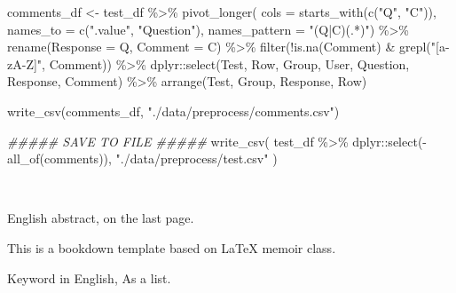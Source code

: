 \documentclass[
  12pt,
  a4paper,
  extrafontsizes,
  onecolumn,
  openright]{memoir}
\makeatletter
\newenvironment{Shaded}{\begin{snugshade}}{\end{snugshade}}
\newcommand{\AttributeTok}[1]{\textcolor[rgb]{0.40,0.45,0.13}{#1}}
\newcommand{\DocumentationTok}[1]{\textcolor[rgb]{0.37,0.37,0.37}{\textit{#1}}}
\newcommand{\FunctionTok}[1]{\textcolor[rgb]{0.28,0.35,0.67}{#1}}
\newcommand{\NormalTok}[1]{\textcolor[rgb]{0.00,0.23,0.31}{#1}}
\newcommand{\OtherTok}[1]{\textcolor[rgb]{0.00,0.23,0.31}{#1}}
\newcommand{\SpecialCharTok}[1]{\textcolor[rgb]{0.37,0.37,0.37}{#1}}
\newcommand{\StringTok}[1]{\textcolor[rgb]{0.13,0.47,0.30}{#1}}
\newcommand{\MemoirChapStyle}{daleif1}
\newcommand{\MemoirPageStyle}{Ruled}
\newlength\widthw %
\newcommand*{\SmallMargins}{
  \setlrmarginsandblock{1.5in}{1.5in}{*}
  \setmarginnotes{0.1in}{0.1in}{0.1in}
  \setulmarginsandblock{1.5in}{1in}{*}
  \checkandfixthelayout
  \ch@ngetext
  \clearpage
  \setlength{\widthw}{\textwidth+\marginparsep+\marginparwidth}
  \footnotesatfoot
  \chapterstyle{\MemoirChapStyle}  %
  \pagestyle{\MemoirPageStyle}
}
\newcommand{\evenpage}{
  \clearpage
  \strictpagecheck %
  \checkoddpage
  \ifoddpage
    \thispagestyle{empty}
    ~\\ %
    \newpage
  \else
  \fi

  
}
\makeatother
\begin{document}
\begin{Shaded}
\begin{Highlighting}[]
\NormalTok{comments\_df }\OtherTok{\textless{}{-}}\NormalTok{ test\_df }\SpecialCharTok{\%\textgreater{}\%}
    \FunctionTok{pivot\_longer}\NormalTok{(}
        \AttributeTok{cols =} \FunctionTok{starts\_with}\NormalTok{(}\FunctionTok{c}\NormalTok{(}\StringTok{"Q"}\NormalTok{, }\StringTok{"C"}\NormalTok{)),}
        \AttributeTok{names\_to =} \FunctionTok{c}\NormalTok{(}\StringTok{".value"}\NormalTok{, }\StringTok{"Question"}\NormalTok{),}
        \AttributeTok{names\_pattern =} \StringTok{"(Q|C)(.*)"}\NormalTok{) }\SpecialCharTok{\%\textgreater{}\%}
    \FunctionTok{rename}\NormalTok{(}\AttributeTok{Response =}\NormalTok{ Q, }\AttributeTok{Comment =}\NormalTok{ C) }\SpecialCharTok{\%\textgreater{}\%}
    \FunctionTok{filter}\NormalTok{(}\SpecialCharTok{!}\FunctionTok{is.na}\NormalTok{(Comment) }\SpecialCharTok{\&} \FunctionTok{grepl}\NormalTok{(}\StringTok{"[a{-}zA{-}Z]"}\NormalTok{, Comment)) }\SpecialCharTok{\%\textgreater{}\%}
\NormalTok{    dplyr}\SpecialCharTok{::}\FunctionTok{select}\NormalTok{(Test, Row, Group, User, Question, Response, Comment) }\SpecialCharTok{\%\textgreater{}\%}
    \FunctionTok{arrange}\NormalTok{(Test, Group, Response, Row)}


\FunctionTok{write\_csv}\NormalTok{(comments\_df, }\StringTok{"./data/preprocess/comments.csv"}\NormalTok{)}

\DocumentationTok{\#\#\#\#\# SAVE TO FILE \#\#\#\#\#}
\FunctionTok{write\_csv}\NormalTok{(}
\NormalTok{    test\_df }\SpecialCharTok{\%\textgreater{}\%}\NormalTok{ dplyr}\SpecialCharTok{::}\FunctionTok{select}\NormalTok{(}\SpecialCharTok{{-}}\FunctionTok{all\_of}\NormalTok{(comments)), }\StringTok{"./data/preprocess/test.csv"}
\NormalTok{)}
\end{Highlighting}
\end{Shaded}

\normalsize


\backmatter

\SmallMargins

\onecolumn



\evenpage
\SmallMargins
\thispagestyle{empty}

\begin{normalsize}

\begin{description}

\item[Abstract]
English abstract, on the last page.

This is a bookdown template based on LaTeX memoir class.
\item[Keywords]
Keyword in English, As a list.
~\\

\end{description}

\end{normalsize}
\end{document}
